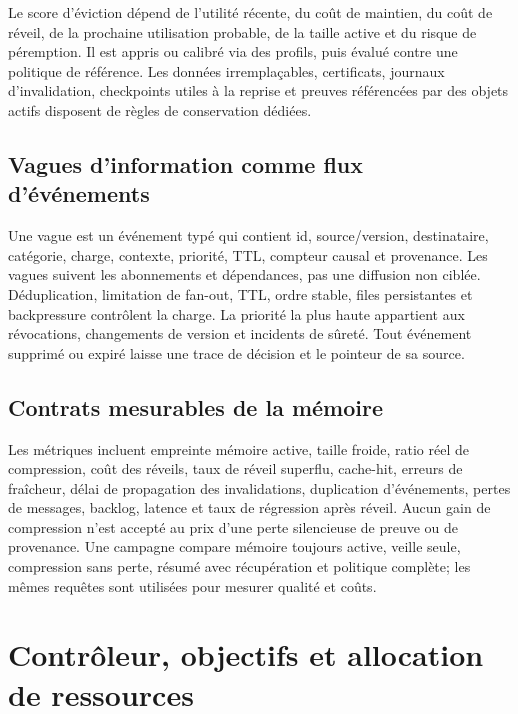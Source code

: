 \documentclass[11pt,a4paper]{article}
\begin{document}
Le score d'éviction dépend de l'utilité récente, du coût de maintien, du coût de réveil, de la prochaine utilisation probable, de la taille active et du risque de péremption. Il est appris ou calibré via des profils, puis évalué contre une politique de référence. Les données irremplaçables, certificats, journaux d'invalidation, checkpoints utiles à la reprise et preuves référencées par des objets actifs disposent de règles de conservation dédiées.

\subsection{Vagues d'information comme flux d'événements}
Une vague est un événement typé qui contient id, source/version, destinataire, catégorie, charge, contexte, priorité, TTL, compteur causal et provenance. Les vagues suivent les abonnements et dépendances, pas une diffusion non ciblée. Déduplication, limitation de fan-out, TTL, ordre stable, files persistantes et backpressure contrôlent la charge. La priorité la plus haute appartient aux révocations, changements de version et incidents de sûreté. Tout événement supprimé ou expiré laisse une trace de décision et le pointeur de sa source.

\subsection{Contrats mesurables de la mémoire}
Les métriques incluent empreinte mémoire active, taille froide, ratio réel de compression, coût des réveils, taux de réveil superflu, cache-hit, erreurs de fraîcheur, délai de propagation des invalidations, duplication d'événements, pertes de messages, backlog, latence et taux de régression après réveil. Aucun gain de compression n'est accepté au prix d'une perte silencieuse de preuve ou de provenance. Une campagne compare mémoire toujours active, veille seule, compression sans perte, résumé avec récupération et politique complète; les mêmes requêtes sont utilisées pour mesurer qualité et coûts.

\section{Contrôleur, objectifs et allocation de ressources}
\end{document}
